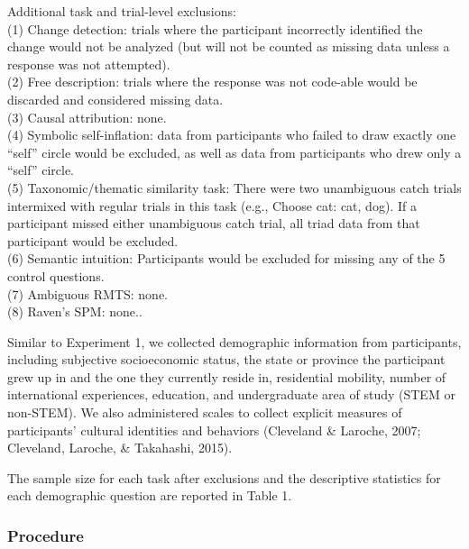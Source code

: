 \documentclass[
  man,floatsintext]{apa6}
\begin{document}
{  Additional task and trial-level exclusions:\\
  (1) Change detection: trials where the participant incorrectly identified the change would not be analyzed (but will not be counted as missing data unless a response was not attempted).\\
  (2) Free description: trials where the response was not code-able would be discarded and considered missing data.\\
  (3) Causal attribution: none.\\
  (4) Symbolic self-inflation: data from participants who failed to draw exactly one ``self'' circle would be excluded, as well as data from participants who drew only a ``self'' circle.\\
  (5) Taxonomic/thematic similarity task: There were two unambiguous catch trials intermixed with regular trials in this task (e.g., Choose cat: cat, dog). If a participant missed either unambiguous catch trial, all triad data from that participant would be excluded.\\
  (6) Semantic intuition: Participants would be excluded for missing any of the 5 control questions.\\
  (7) Ambiguous RMTS: none.\\
  (8) Raven's SPM: none.}.

Similar to Experiment 1, we collected demographic information from participants, including subjective socioeconomic status, the state or province the participant grew up in and the one they currently reside in, residential mobility, number of international experiences, education, and undergraduate area of study (STEM or non-STEM). We also administered scales to collect explicit measures of participants' cultural identities and behaviors (Cleveland \& Laroche, 2007; Cleveland, Laroche, \& Takahashi, 2015).

The sample size for each task after exclusions and the descriptive statistics for each demographic question are reported in Table 1.

\hypertarget{procedure-1}{%
\subsubsection{Procedure}\label{procedure-1}}
\end{document}
